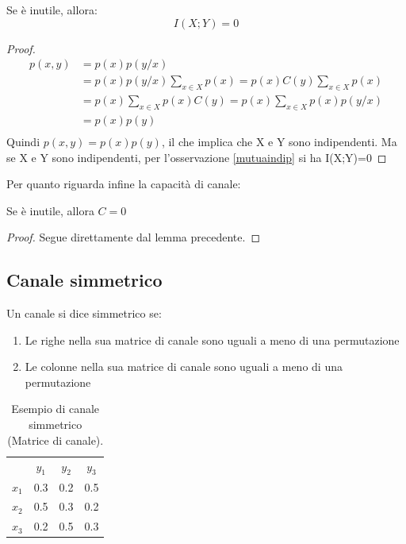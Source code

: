 \begin{lemma}
 Se  è inutile, allora:
\[
  I(X;Y)=0
\]
 \begin{proof}
\[\begin{split}
 p(x,y)&=p(x)p(y/x) \\
       &=p(x)p(y/x)\sum_{x \in X}p(x) 
       =p(x)C(y)\sum_{x \in X}p(x) \\
       &=p(x) \sum_{x \in X}p(x)C(y)
       =p(x) \sum_{x \in X}p(x)p(y/x)\\
       &=p(x) p(y) \\
  \end{split}
\]
Quindi $p(x,y)=p(x)p(y)$, il che implica che X e Y sono indipendenti.
Ma se X e Y sono indipendenti, per l'osservazione \ref{mutuaindip} si ha I(X;Y)=0
 \end{proof}
\end{lemma}

\noindent
Per quanto riguarda infine la capacità di canale:

\begin{lemma}
Se  è inutile, allora $C=0$
\begin{proof}
Segue direttamente dal lemma precedente.
\end{proof}
\end{lemma}

\subsection{Canale simmetrico}

\medskip

\begin{definizione}
 Un canale si dice simmetrico se:
 \begin{enumerate}
  \item Le righe nella sua matrice di canale sono uguali a meno di una permutazione
  \item Le colonne nella sua matrice di canale sono uguali a meno di una permutazione
 \end{enumerate}
\end{definizione}


\begin{table}[htbp]
  \begin{center}
   \begin{tabular}{c c c c}
	& $y_1$ & $y_2$ & $y_3$ \\
	$x_1$ & 0.3 & 0.2 & 0.5 \\ 
	$x_2$ & 0.5 & 0.3 & 0.2  \\ 
	$x_3$ & 0.2 & 0.5 & 0.3  \\ 
    \end{tabular}
  \caption{Esempio di canale simmetrico (Matrice di canale).}
  \label{tab:tsim}
  \end{center}
\end{table}


